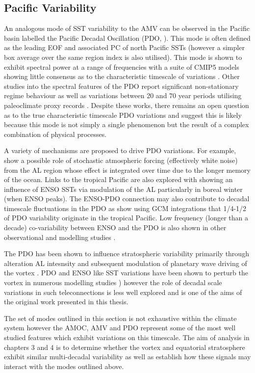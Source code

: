 \subsection{Pacific Variability}
\label{sec:PDO}
An analogous mode of SST variability to the AMV can be observed in the Pacific basin labelled the Pacific Decadal Oscillation (PDO, \cite{mantuaPacific1997a}). This mode is often defined as the leading EOF and associated PC of north Pacific SSTs (however a simpler box average over the same region index is also utilised). This mode is shown to exhibit spectral power at a range of frequencies with a suite of CMIP5 models showing little consensus as to the characteristic timescale of variations \cite{newmanPacific2016}. Other studies into the spectral features of the PDO report significant non-stationary regime behaviour \citep{overlandRegime2006, flemingNonuniqueness2014} as well as variations between 20 and 70 year periods utilising paleoclimate proxy records \citep{biondiNorth2001}. Despite these works, there remains an open question as to the true characteristic timescale PDO variations and \cite{newmanPacific2016} suggest this is likely because this mode is not simply a single phenomenon but the result of a complex combination of physical processes. 

A variety of mechanisms are proposed to drive PDO variations. For example, \cite{frankignoulStochastic1977} show a possible role of stochastic atmospheric forcing (effectively white noise) from the AL region whose effect is integrated over time due to the longer memory of the ocean. Links to the tropical Pacific are also explored with \cite{strongRole2009} showing an influence of ENSO SSTs via modulation of the AL particularly in boreal winter (when ENSO peaks). The ENSO-PDO connection may also contribute to decadal timescale fluctuations in the PDO as \cite{alexanderAtmospheric2002, alexanderRole2008} show using GCM integrations that 1/4-1/2 of PDO variability originate in the tropical Pacific. Low frequency (longer than a decade) co-variability between ENSO and the PDO is also shown in other observational and modelling studies \citep{vimontContribution2005, chenENSOLike2015}.

The PDO has been shown to influence stratospheric variability primarily through alteration AL intesnsity and subsequent modulation of planetary wave driving of the vortex \citep{krenWintertime2016b,Kang2017,huDecadal2018b}. PDO and ENSO like SST variations have been shown to perturb the vortex in numerous modelling studies \citep{krenWintertime2016b,garcia-herreraPropagation2006b}) however the role of decadal scale variations in such teleconnections is less well explored and is one of the aims of the original work presented in this thesis.

The set of modes outlined in this section is not exhaustive within the climate system however the AMOC, AMV and PDO represent some of the most well studied features which exhibit variations on this timescale. The aim of analysis in chapters 3 and 4 is to determine whether the vortex and equatorial stratosphere exhibit similar multi-decadal variability as well as establish how these signals may interact with the modes outlined above.



